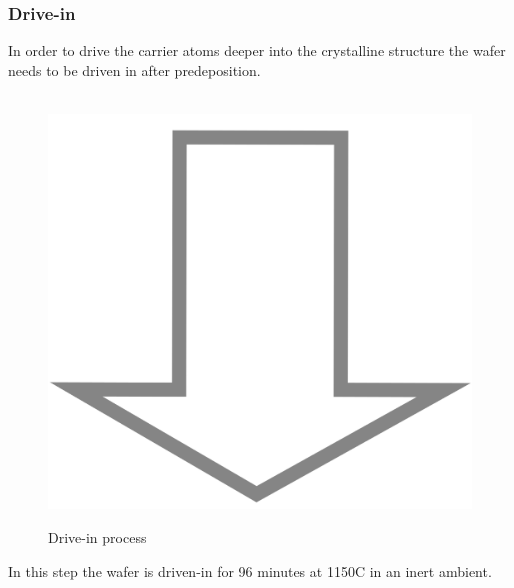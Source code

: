 \subsubsection{Drive-in}
In order to drive the carrier atoms deeper into the crystalline structure the wafer needs to be driven in after predeposition.
\begin{figure}[H]
	\centering
	\begin{tikzpicture}[node distance = 3cm, auto, thick,scale=\CrossSectionOnly, every node/.style={transform shape}]
		
	\end{tikzpicture} \\
	\includegraphics[scale=0.01]{down_arrow.png} \\
	\begin{tikzpicture}[node distance = 3cm, auto, thick,scale=\CrossSectionOnly, every node/.style={transform shape}]
		
	\end{tikzpicture}
	\caption{Drive-in process}
\end{figure}
In this step the wafer is  driven-in for 96 minutes at 1150\degree C in an inert ambient.

